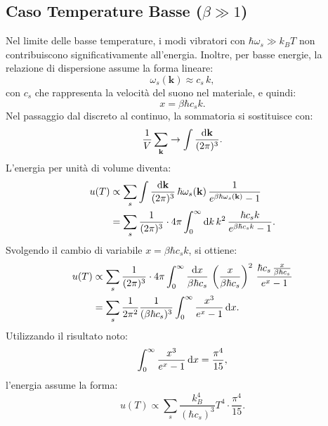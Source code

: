 \subsection*{Caso Temperature Basse (\(\beta \gg 1\))}
Nel limite delle basse temperature, i modi vibratori con \(\hbar \omega_s \gg k_B T\) non contribuiscono significativamente all'energia. Inoltre, per basse energie, la relazione di dispersione assume la forma lineare:
\begin{equation}
    \omega_s(\mathbf{k}) \approx c_s\, k,
\end{equation}
con \(c_s\) che rappresenta la velocità del suono nel materiale, e quindi:
\begin{equation}
    x = \beta \hbar c_s k.
\end{equation}
Nel passaggio dal discreto al continuo, la sommatoria si sostituisce con:
\begin{equation}
    \frac{1}{V}\sum_{\mathbf{k}} \to \int \frac{\text{d}\mathbf{k}}{(2\pi)^3}.
\end{equation}
L'energia per unità di volume diventa:
\begin{equation}
\begin{split}
    u(T) &\propto \sum_s \int \frac{\text{d}\mathbf{k}}{(2\pi)^3}\, \hbar \omega_s(\mathbf{k}) \, \frac{1}{e^{\beta \hbar \omega_s(\mathbf{k})} - 1} \\
         &= \sum_s \frac{1}{(2\pi)^3} \cdot 4\pi \int_0^{\infty} \text{d}{k}\, k^2\, \frac{\hbar c_s k}{e^{\beta \hbar c_s k} - 1}.
\end{split}
\end{equation}
Svolgendo il cambio di variabile \(x = \beta \hbar c_s k\), si ottiene:
\begin{equation}
\begin{split}
    u(T) &\propto \sum_s \frac{1}{(2\pi)^3} \cdot 4\pi \int_0^{\infty} \frac{\text{d}{x}}{\beta \hbar c_s}\, \left(\frac{x}{\beta \hbar c_s}\right)^2 \, \frac{\hbar c_s \, \frac{x}{\beta \hbar c_s}}{e^{x} - 1} \\
         &= \sum_s \frac{1}{2\pi^2} \frac{1}{(\beta \hbar c_s)^3} \int_0^{\infty} \frac{x^3}{e^x - 1}\, \text{d}{x}.
\end{split}
\end{equation}
Utilizzando il risultato noto:
\begin{equation}
    \int_0^{\infty} \frac{x^3}{e^x - 1}\, \text{d}{x} = \frac{\pi^4}{15},
\end{equation}
l'energia assume la forma:
\begin{equation}
    u(T) \propto \sum_s \frac{k_B^4}{(\hbar c_s)^3} T^4 \cdot \frac{\pi^4}{15}.
\end{equation}
